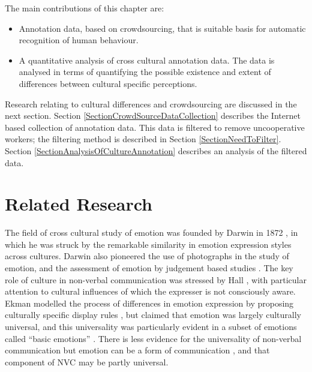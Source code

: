 The main contributions of this chapter are:
\begin{itemize}
 \item Annotation data, based on crowdsourcing, that is suitable basis for automatic recognition of human behaviour.
 \item A quantitative analysis of cross cultural annotation data. The data is analysed in terms of quantifying the possible existence and extent of differences between cultural specific perceptions.
\end{itemize}

Research relating to cultural differences and crowdsourcing are discussed in the next section. Section \ref{SectionCrowdSourceDataCollection} describes the Internet based collection of annotation data. This data is filtered to remove uncooperative workers; the filtering method is described in Section \ref{SectionNeedToFilter}. Section \ref{SectionAnalysisOfCultureAnnotation} describes an analysis of the filtered data.

\section{Related Research}
\label{BackgroundCrossCulture}

The field of cross cultural study of emotion was founded by Darwin in 1872 \cite{Darwin2002}, in which he was struck by the remarkable similarity in emotion expression styles across cultures. 
Darwin also pioneered the use of photographs in the study of emotion, and the assessment of emotion by judgement based studies \cite{Ekman2009}. The key role of culture in non-verbal communication was stressed by Hall \cite{Hall1959}, with particular attention to cultural influences of which the expresser is not consciously aware. Ekman modelled the process of differences in emotion expression by proposing culturally specific display rules \cite{Ekman1969}, but claimed that emotion was largely culturally universal, and this universality was particularly evident in a subset of emotions called ``basic emotions'' \cite{Ekman1972}.
There is less evidence for the universality of non-verbal communication but emotion can be a form of communication \cite{Frith2009}, and that component of \ac{NVC} may be partly universal. %

